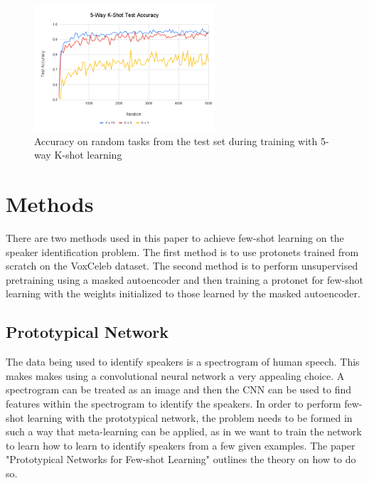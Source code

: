\documentclass{article}
\begin{document}

\begin{figure}
  \centering
  \includegraphics[width=0.6\textwidth]{Images/5-Way K-Shot Test Accuracy.png}
  \caption{Accuracy on random tasks from the test set during training with 5-way K-shot learning}
  \label{fig:FiveWayAccuracy}
\end{figure}

\section{ Methods }
There are two methods used in this paper to achieve few-shot learning on the speaker identification problem. The first
method is to use protonets trained from scratch on the VoxCeleb dataset. The second method is to perform unsupervised
pretraining using a masked autoencoder and then training a protonet for few-shot learning with the weights initialized
to those learned by the masked autoencoder.

\subsection{Prototypical Network}
The data being used to identify speakers is a spectrogram of human speech. This makes makes using a convolutional neural network
a very appealing choice. A spectrogram can be treated as an image and then the CNN can be used to find features within
the spectrogram to identify the speakers. In order to perform few-shot learning with the prototypical network, the problem
needs to be formed in such a way that meta-learning can be applied, as in we want to train the network to learn how to learn
to identify speakers from a few given examples. The paper "Prototypical Networks for Few-shot Learning" \cite{DBLP:journals/corr/SnellSZ17}
outlines the theory on how to do so.
\end{document}
